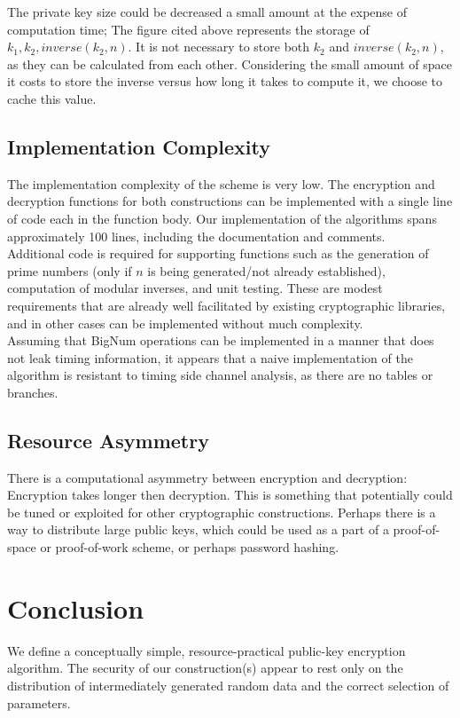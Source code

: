 \documentclass[preprint]{iacrtrans}
\begin{document}
The private key size could be decreased a small amount at the expense of computation time; The figure cited above represents the storage of $k_1, k_2, inverse(k_2, n)$. It is not necessary to store both $k_2$ and $inverse(k_2, n)$, as they can be calculated from each other. Considering the small amount of space it costs to store the inverse versus how long it takes to compute it, we choose to cache this value.

\subsection{Implementation Complexity}
The implementation complexity of the scheme is very low. The encryption and decryption functions for both constructions can be implemented with a single line of code each in the function body. Our implementation of the algorithms spans approximately 100 lines, including the documentation and comments.\\

Additional code is required for supporting functions such as the generation of prime numbers (only if $n$ is being generated/not already established), computation of modular inverses, and unit testing. These are modest requirements that are already well facilitated by existing cryptographic libraries, and in other cases can be implemented without much complexity. \\

Assuming that BigNum operations can be implemented in a manner that does not leak timing information, it appears that a naive implementation of the algorithm is resistant to timing side channel analysis, as there are no tables or branches.

\subsection{Resource Asymmetry}
There is a computational asymmetry between encryption and decryption: Encryption takes longer then decryption. This is something that potentially could be tuned or exploited for other cryptographic constructions. Perhaps there is a way to distribute large public keys, which could be used as a part of a proof-of-space or proof-of-work scheme, or perhaps password hashing.

\section{Conclusion}
We define a conceptually simple, resource-practical public-key encryption algorithm. The security of our construction(s) appear to rest only on the distribution of intermediately generated random data and the correct selection of parameters.
\end{document}
